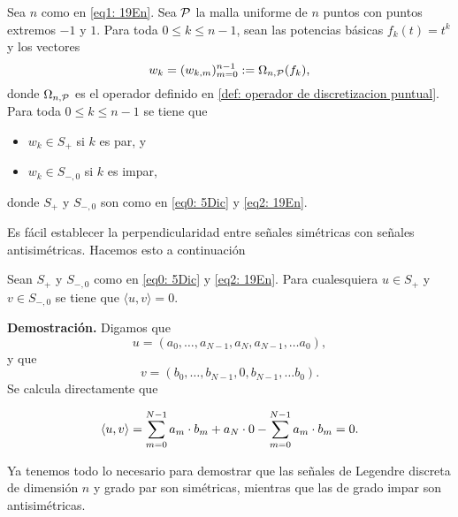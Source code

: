 \begin{obs}
\label{obs: pertenencia}
Sea $n$ como en \eqref{eq1: 19En}. 
Sea $\mathcal{P}$ la malla
uniforme de $n$ puntos con puntos extremos $-1$ y $1$.
Para toda $0 \leq k \leq n-1$, sean
las potencias básicas $f_{k}(t)=t^{k}$ y los vectores
\begin{equation}
\label{eq4: 10Dic}
w_{k}=(w_{k,m})_{m=0}^{n-1} := \Omega_{n, \mathcal{P}}(f_{k}),
\end{equation}
donde $\Omega_{n, \mathcal{P}}$ es el operador definido en 
\ref{def: operador de discretizacion puntual}.
Para toda $0 \leq k \leq n-1$ se tiene que
\begin{itemize}
\item $w_{k} \in S_{+}$ si $k$ es par, y
\item $w_{k} \in S_{-,0}$ si $k$ es impar,
\end{itemize}
donde $S_{+}$ y $S_{-,0}$ son como en 
\eqref{eq0: 5Dic} y \eqref{eq2: 19En}.
\end{obs}

Es fácil establecer la perpendicularidad entre
señales simétricas con señales antisimétricas.
Hacemos esto a continuación

\begin{lema}
\label{lema: ortogonalidad entre sim y antisim}
Sean $S_{+}$ y $S_{-,0}$ como en 
\eqref{eq0: 5Dic} y \eqref{eq2: 19En}. Para cualesquiera 
$u \in S_{+}$ y $v \in S_{-,0}$ se tiene que
$\langle u, v \rangle=0$.
\end{lema}
\noindent
\textbf{Demostración.}
Digamos que 
\begin{equation*}
u=(a_{0}, \ldots , a_{N-1}, a_{N}, a_{N-1}, \ldots a_{0}),
\end{equation*}
y que 
\begin{equation*}
v=(b_{0}, \ldots , b_{N-1}, 0, b_{N-1}, \ldots b_{0}).
\end{equation*}
Se calcula directamente que 

\[
\langle u, v \rangle = \sum\limits_{m=0}^{N-1}a_{m} \cdot b_{m} + a_{N} \cdot 0
-\sum\limits_{m=0}^{N-1}a_{m} \cdot b_{m} =0.
\]

\QEDB
\vspace{0.2cm}


Ya tenemos todo lo necesario para demostrar que las
señales de Legendre discreta de dimensión $n$ y grado
par son simétricas, mientras que las de grado
impar son antisimétricas.


